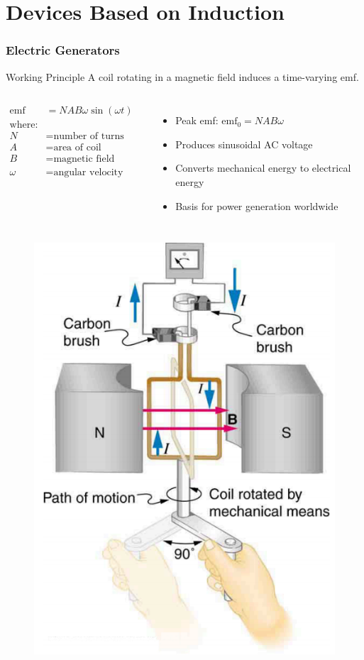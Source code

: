 \documentclass{beamer}
\begin{document}
\section{Devices Based on Induction}

\begin{frame}
\frametitle{Electric Generators}
\begin{block}{Working Principle}
A coil rotating in a magnetic field induces a time-varying emf.
\end{block}

\begin{columns}
\begin{align}
\text{emf} &= NAB\omega\sin(\omega t) \\
\text{where:} \\
N &= \text{number of turns} \\
A &= \text{area of coil} \\
B &= \text{magnetic field strength} \\
\omega &= \text{angular velocity}
\end{align}

\begin{itemize}
\item Peak emf: $\text{emf}_0 = NAB\omega$
\item Produces sinusoidal AC voltage
\item Converts mechanical energy to electrical energy
\item Basis for power generation worldwide
\end{itemize}
\end{columns}

\end{frame}

\begin{frame}
\begin{figure}
    \centering
    \includegraphics[width=0.6\linewidth]{genyr.png}
\end{figure}
\end{frame}
\end{document}
